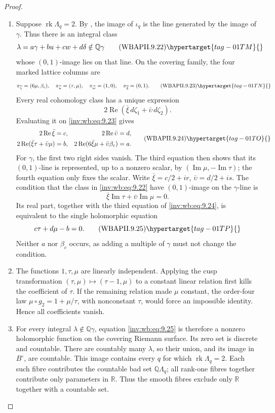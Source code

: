 \begin{proof}
\begin{enumerate}[label=\arabic*.,leftmargin=*]
\item Suppose \(\operatorname{rk}\Lambda_q=2\).  By
, the image of \(\iota_q\) is the line
generated by the image of \(\gamma\).  Thus there is an integral class
\[
 \lambda=a\gamma+bu+cw+d\delta\notin\mathbb Q\gamma
\tag{WBAPII.9.22}\hypertarget{tag-01TM}{}\label{inv:wb:eq:9.22}
\]
whose \((0,1)\)-image lies on that line.  On the covering family, the four
marked lattice columns are
\[
 \pi_{\widehat\gamma}=(6\mu,\beta_c),\quad
 \pi_{\widehat u}=(\tau,\mu),\quad
 \pi_{\widehat w}=(1,0),\quad
 \pi_{\widehat\delta}=(0,1).
\tag{WBAPII.9.23}\hypertarget{tag-01TN}{}\label{inv:wb:eq:9.23}
\]
Every real cohomology class has a unique expression
\[
 2\operatorname{Re}(\bar\xi\,d\zeta_1+
                       \bar\upsilon\,d\zeta_2).
\]
Evaluating it on \eqref{inv:wb:eq:9.23} gives
\[
\begin{aligned}
2\operatorname{Re}\bar\xi&=c,&
2\operatorname{Re}\bar\upsilon&=d,\\
2\operatorname{Re}(\bar\xi\tau+\bar\upsilon\mu)&=b,&
2\operatorname{Re}(6\bar\xi\mu+\bar\upsilon\beta_c)&=a.
\end{aligned}
\tag{WBAPII.9.24}\hypertarget{tag-01TO}{}\label{inv:wb:eq:9.24}
\]
For \(\gamma\), the first two right sides vanish.  The third equation then
shows that its \((0,1)\)-line is represented, up to a nonzero scalar, by
\((\operatorname{Im}\mu,-\operatorname{Im}\tau)\); the fourth equation
only fixes the scalar.  Write
\(\bar\xi=c/2+ir\), \(\bar\upsilon=d/2+is\).  The condition that the class
in \eqref{inv:wb:eq:9.22} have \((0,1)\)-image on the \(\gamma\)-line is
\[
 \bar\xi\operatorname{Im}\tau+
 \bar\upsilon\operatorname{Im}\mu=0.
\]
Its real part, together with the third equation of \eqref{inv:wb:eq:9.24}, is equivalent
to the single holomorphic equation
\[
 c\tau+d\mu-b=0.
\tag{WBAPII.9.25}\hypertarget{tag-01TP}{}\label{inv:wb:eq:9.25}
\]
Neither \(a\) nor \(\beta_c\) occurs, as adding a multiple of \(\gamma\)
must not change the condition.

\item The functions \(1,\tau,\mu\) are linearly independent.  Applying the cusp
transformation \((\tau,\mu)\mapsto(\tau-1,\mu)\) to a constant linear
relation first kills the coefficient of \(\tau\).  If the remaining
relation made \(\mu\) constant, the order-four law
\(\mu\circ g_2=1+\mu/\tau\), with nonconstant \(\tau\), would force an
impossible identity.  Hence all coefficients vanish.

\item For every integral \(\lambda\notin\mathbb Q\gamma\), equation \eqref{inv:wb:eq:9.25} is
therefore a nonzero holomorphic function on the covering Riemann surface.
Its zero set is discrete and countable.  There are countably many
\(\lambda\), so their union, and its image in \(B^\circ\), are countable.
This image contains every \(q\) for which
\(\operatorname{rk}\Lambda_q=2\).  Each such fibre contributes the
countable bad set \(\mathbb Q\Lambda_q\); all rank-one fibres together
contribute only parameters in \(\mathbb R\).  Thus the smooth fibres
exclude only \(\mathbb R\) together with a countable set.


\end{enumerate}
\end{proof}
